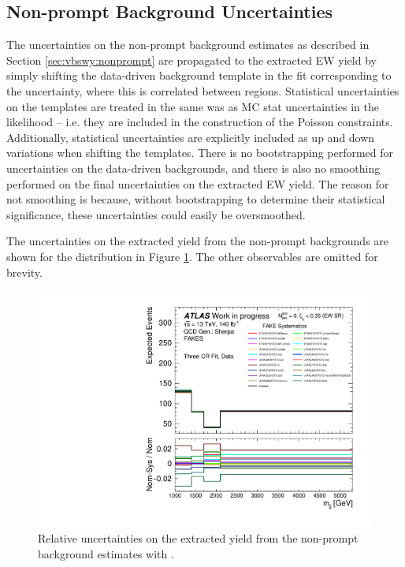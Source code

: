 \subsection{Non-prompt Background Uncertainties}

The uncertainties on the non-prompt background estimates as described in Section \ref{sec:vbswy:nonprompt} are propagated to the extracted EW yield by simply shifting the data-driven background template in the fit corresponding to the uncertainty, where this is correlated between regions. Statistical uncertainties on the templates are treated in the same was as MC stat uncertainties in the likelihood -- i.e. they are included in the construction of the Poisson constraints. Additionally, statistical uncertainties are explicitly included as up and down variations when shifting the templates. There is no bootstrapping performed for uncertainties on the data-driven backgrounds, and there is also no smoothing performed on the final uncertainties on the extracted EW yield. The reason for not smoothing is because, without bootstrapping to determine their statistical significance, these uncertainties could easily be oversmoothed. 

The uncertainties on the extracted \ewwy yield from the non-prompt backgrounds are shown for the \mjj distribution in Figure \ref{fig:vbswy:fakesvariations}. The other observables are omitted for brevity.

\begin{figure}[t]
  \centering
  \includegraphics[width=\textwidth]{plots/diffx/expsysts/groups/mjj_QCD_Sh2211_FAKES_3cr_FAKE_0p01sigma_allvariations.pdf}
  \caption{}
  \caption{Relative uncertainties on the extracted \ewwy yield from the non-prompt background estimates with \mjj.}
  \label{fig:vbswy:fakesvariations}
\end{figure}

